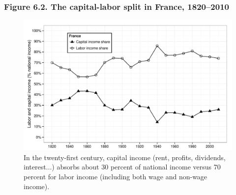 \documentclass[t]{beamer}\usepackage[]{graphicx}\usepackage[]{color}
\newenvironment{knitrout}{}{} %
\begin{document}
\begin{frame}[label=Figure_6_2]
\frametitle{Figure 6.2. The capital-labor split in France, 1820--2010}
\begin{figure}[t]
\begin{minipage}[b]{\textwidth}
\centering
\begin{knitrout}\footnotesize
{}\color{fgcolor}

{\centering \includegraphics[width=1\linewidth]{figures/bw/Figure_6_2} 

}



\end{knitrout}
\caption{In the twenty-first century, capital income (rent, profits, dividends, interest...) absorbs about 30 percent of national income versus 70 percent for labor income (including both wage and non-wage income).}
\end{minipage}
\end{figure}
\end{frame}
\end{document}
